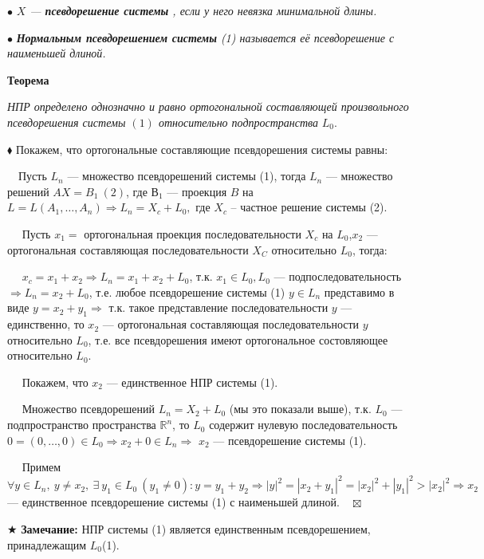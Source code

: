 \documentclass[a4paper, 12pt]{report}
\begin{document}
	$\bullet$\textit{ $X$ --- \textbf{ псевдорешение системы }, если у него невязка минимальной длины.}
	
	$\bullet$\textit{ \textbf{Нормальным псевдорешением системы} (1) называется её псевдорешение с наименьшей длиной.}
	
	\par\bigskip
	
	\textbf{Теорема}
	
	\textit{НПР определено однозначно и равно ортогональной составляющей
		произвольного псевдорешения системы $(1)$ относительно подпространства} $L_0$.
	\par\bigskip
	$\blacklozenge$ Покажем, что ортогональные составляющие псевдорешения системы равны: 
	
	$\quad$Пусть $L_n$ --- множество псевдорешений системы (1), тогда $L_n$ --- множество решений $AX = B_1\ (2)$, где $В_1$ --– проекция $B$ на $L = L(A_1, \dots , A_n) \Rightarrow L_n = X_c + L_0 , $ где $X_c $ – частное
	решение системы (2). 
	
	$\quad$
	Пусть $x_1 = $ ортогональная проекция последовательности $ X_c$  на $L_0$,$ x_2 $  --- ортогональная
	составляющая последовательности $X_C$ относительно $L_0$, тогда:
	
	$\quad$
	$x_c = x_1 + x_2 \Rightarrow L_n = x_1 + x_2 + L_0$, т.к. $x_1 \in  L_0, L_0$ --- подпоследовательность $\Rightarrow L_n = x_2 + L_0$,
	т.е. любое псевдорешение системы (1) $y \in L_n$ представимо в виде $y = x_2 + y_1 \Rightarrow$ т.к.
	такое представление последовательности $y$ --- единственно, то $x_2$ --- ортогональная
	составляющая последовательности $y$ относительно $L_0$, т.е. все псевдорешения имеют
	ортогональное состовляющее относительно $L_0.$
	
	$\quad$
	Покажем, что $x_2$ --- единственное НПР системы (1).
	
	$\quad$
	Множество псевдорешений $L_n = X_2 + L_0 $ (мы это показали выше), т.к. $L_0$ ---
	подпространство пространства $\mathbb{R}^n$, то $L_0$ содержит нулевую последовательность $0 =
	(0,\dots,0) \in L_0 \Rightarrow x_2 + 0 \in L_n \Rightarrow$ $x_2$  --- псевдорешение системы (1).
	
	$\quad$
	Примем $\forall y \in L_n ,\ y \neq x_2,\ \exists\ y_1 \in L_0\ (y_1 \neq 0) : y = y_1 + y_2 \Rightarrow |y|^2 = |x_2 + y_1|^2 = |x_2|^2 + |y_1|^2 > |x_2|^2
	\Rightarrow x_2$ --- единственное псевдорешение системы (1) с наименьшей длиной.$\quad\boxtimes$
	\par\bigskip
	$\bigstar$ \textbf{Замечание:} НПР системы (1) является единственным псевдорешением,
	принадлежащим $L_0$(1).
	
\end{document}
